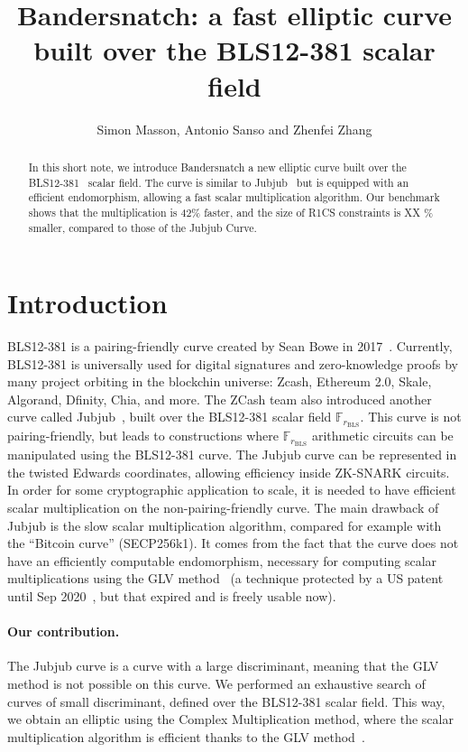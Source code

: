\documentclass{article}
\title{Bandersnatch: a fast elliptic curve built over the BLS12-381
  scalar field}
\author{Simon Masson, Antonio Sanso and Zhenfei Zhang}
\makeatletter
\theoremstyle{definition}
\newcommand{\verbatimfont}[1]{\renewcommand{\verbatim@font}{\ttfamily#1}}
\makeatother
\begin{document}
\verbatimfont{\small}%

\maketitle
\medskip
\begin{abstract}
 In this short note, we introduce Bandersnatch a new elliptic curve
 built over the BLS12-381~\cite{bls12381} scalar field. The curve is
 similar to Jubjub~\cite{jubjub} but is equipped with an efficient
 endomorphism, allowing a fast scalar multiplication algorithm.
 Our benchmark shows that the multiplication is 42\% faster, 
 and the size of R1CS constraints is XX \% smaller, 
 compared to those of the Jubjub Curve.
\end{abstract}

\section{Introduction}
BLS12-381 is a pairing-friendly curve created by Sean Bowe in
2017~\cite{bls12381}.
Currently, BLS12-381 is universally used for digital
signatures and zero-knowledge proofs by many project orbiting in the
blockchin universe: Zcash, Ethereum 2.0, Skale, Algorand, Dfinity,
Chia, and more.
The ZCash team also introduced another curve called
Jubjub~\cite{jubjub}, built over the BLS12-381 scalar field $\mathbb
F_{r_\text{BLS}}$.
This curve is not pairing-friendly, but leads to constructions where
$\mathbb F_{r_\text{BLS}}$ arithmetic circuits can be manipulated
using the BLS12-381 curve.
The Jubjub curve can be represented in the twisted Edwards
coordinates, allowing efficiency inside ZK-SNARK circuits.
In order for some cryptographic application to scale, it is needed to
have efficient scalar multiplication on the non-pairing-friendly
curve.
The main drawback of Jubjub is the slow scalar multiplication
algorithm, compared for example with the ``Bitcoin curve''
(SECP256k1).
It comes from the fact that the curve does not have an efficiently
computable endomorphism, necessary for computing scalar
multiplications using the GLV method~\cite{C:GalLamVan01} (a technique
protected by a US patent until Sep 2020~\cite{glvpatent}, but that 
expired and is
freely usable now).

\paragraph{Our contribution.}
The Jubjub curve is a curve with a large discriminant, meaning that
the GLV method is not possible on this curve.
We performed an exhaustive search of curves of small discriminant,
defined over the BLS12-381 scalar field. This way, we obtain an
elliptic using the Complex Multiplication method, where the scalar
multiplication algorithm is efficient thanks to the GLV
method~\cite{C:GalLamVan01}.
\end{document}
